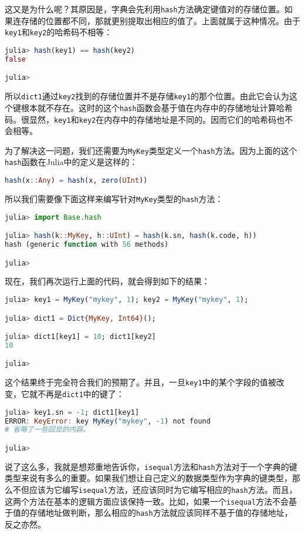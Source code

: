 这又是为什么呢？其原因是，字典会先利用\verb`hash`方法确定键值对的存储位置。如果连存储的位置都不同，那就更别提取出相应的值了。上面就属于这种情况。由于\verb`key1`和\verb`key2`的哈希码不相等：
\begin{lstlisting}[language=julia]
julia> hash(key1) == hash(key2)
false

julia> 
\end{lstlisting}

所以\verb`dict1`通过\verb`key2`找到的存储位置并不是存储\verb`key1`的那个位置。由此它会认为这个键根本就不存在。这时的这个\verb`hash`函数会基于值在内存中的存储地址计算哈希码。很显然，\verb`key1`和\verb`key2`在内存中的存储地址是不同的。因而它们的哈希码也不会相等。

为了解决这一问题，我们还需要为\verb`MyKey`类型定义一个\verb`hash`方法。因为上面的这个\verb`hash`函数在Julia中的定义是这样的：
\begin{lstlisting}[language=julia]
hash(x::Any) = hash(x, zero(UInt))
\end{lstlisting}

所以我们需要像下面这样来编写针对\verb`MyKey`类型的\verb`hash`方法：
\begin{lstlisting}[language=julia]
julia> import Base.hash

julia> hash(k::MyKey, h::UInt) = hash(k.sn, hash(k.code, h))
hash (generic function with 56 methods)

julia> 
\end{lstlisting}

现在，我们再次运行上面的代码，就会得到如下的结果：
\begin{lstlisting}[language=julia]
julia> key1 = MyKey("mykey", 1); key2 = MyKey("mykey", 1);

julia> dict1 = Dict{MyKey, Int64}(); 

julia> dict1[key1] = 10; dict1[key2]
10

julia> 
\end{lstlisting}

这个结果终于完全符合我们的预期了。并且，一旦\verb`key1`中的某个字段的值被改变，它就不再是\verb`dict1`中的键了：
\begin{lstlisting}[language=julia]
julia> key1.sn = -1; dict1[key1]
ERROR: KeyError: key MyKey("mykey", -1) not found
# 省略了一些回显的内容。

julia> 
\end{lstlisting}

说了这么多，我就是想郑重地告诉你，\verb`isequal`方法和\verb`hash`方法对于一个字典的键类型来说有多么的重要。如果我们想让自己定义的数据类型作为字典的键类型，那么不但应该为它编写\verb`isequal`方法，还应该同时为它编写相应的\verb`hash`方法。而且，这两个方法在基本的逻辑方面应该保持一致。比如，如果一个\verb`isequal`方法不会基于值的存储地址做判断，那么相应的\verb`hash`方法就应该同样不基于值的存储地址，反之亦然。


